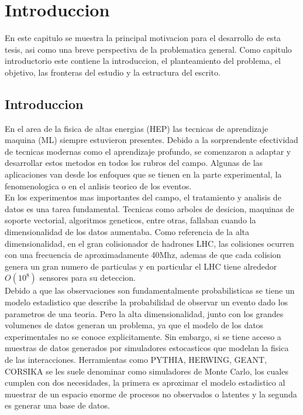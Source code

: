 \chapter{Introduccion}

\label{Chapter1}

En este capitulo se muestra la principal motivacion para el desarrollo de esta tesis, 
asi como una breve perspectiva de la problematica general. Como capitulo introductorio este contiene la introduccion,
el planteamiento del problema, el objetivo, las fronteras del estudio y la estructura del escrito.

\section{Introduccion}

En el area de la fisica de altas energias (HEP) las tecnicas de aprendizaje maquina (ML) siempre estuvieron presentes. 
Debido a la sorprendente efectividad de tecnicas modernas como el aprendizaje profundo, 
se comenzaron a adaptar y desarrollar estos metodos en todos los rubros del campo. 
Algunas de las aplicaciones van desde los enfoques que se tienen en la parte experimental, la fenomenologica o en el anlisis teorico de los eventos.\\

En los experimentos mas importantes del campo, el tratamiento y analisis de datos es una tarea fundamental.
Tecnicas como arboles de desicion, maquinas de soporte vectorial, algoritmos geneticos, entre otras, 
fallaban cuando la dimensionalidad de los datos aumentaba.
Como referencia de la alta dimensionalidad, en el gran colisionador de hadrones LHC, las colisiones ocurren con una frecuencia de aproximadamente 40Mhz,
ademas de que cada colision genera un gran numero de particulas y en particular el LHC tiene alrededor $O(10^8)$ sensores para su deteccion.\\

Debido a que las observaciones son fundamentalmente probabilisticas se tiene un modelo 
estadistico que describe la probabilidad de observar un evento dado los parametros de una teoria.
Pero la alta dimensionalidad, junto con los grandes volumenes de datos generan un problema, ya que el 
modelo de los datos experimentales no se conoce explicitamente.
Sin embargo, si se tiene acceso a muestras de datos generados por simuladores estocasticos que modelan la fisica de las interacciones.
Herramientas como PYTHIA, HERWING, GEANT, CORSIKA se les suele denominar como simuladores de Monte Carlo, los cuales cumplen  con dos necesidades,
la primera es aproximar el modelo estadistico al muestrar de un espacio enorme de procesos no observados o latentes y la segunda es generar una base de datos.\\

